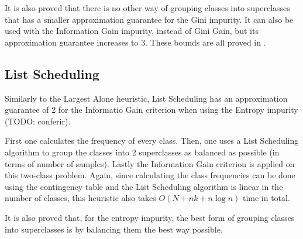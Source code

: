 It is also proved that there is no other way of grouping classes into superclasses that has a smaller approximation guarantee for the Gini impurity. It can also be used with the Information Gain impurity, instead of Gini Gain, but its approximation guarantee increases to 3. These bounds are all proved in \cite{icml2018}.

\subsection{List Scheduling}

Similarly to the Largest Alone heuristic, List Scheduling has an approximation guarantee of 2 for the Informatio Gain criterion when using the Entropy impurity (TODO: conferir).

First one calculates the frequency of every class. Then, one uses a List Scheduling algorithm to group the classes into 2 superclasses as balanced as possible (in terms of number of samples). Lastly the Information Gain criterion is applied on this two-class problem. Again, since calculating the class frequencies can be done using the contingency table and the List Scheduling algorithm is linear in the number of classes, this heuristic also takes $O(N + n k + n \log n)$ time in total.

It is also proved that, for the entropy impurity, the best form of grouping classes into superclasses is by balancing them the best way possible.

